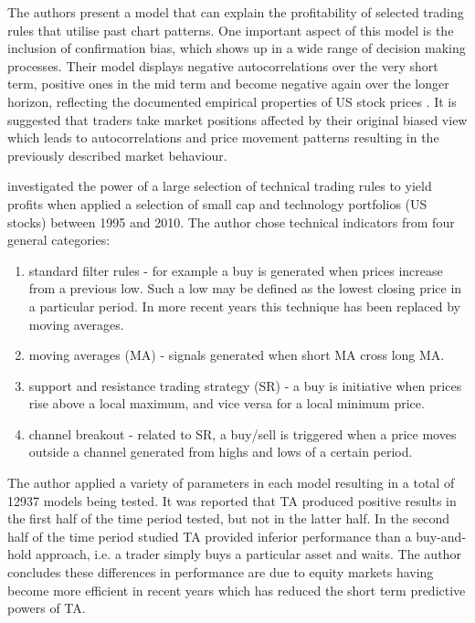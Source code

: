 The authors present a model that can explain the profitability of selected trading rules that utilise past chart patterns. One important aspect of this model is the inclusion of confirmation bias, which shows up in a wide range of decision making processes. Their model displays negative autocorrelations over the very short term, positive ones in the
mid term and become negative again over the longer horizon, reflecting the documented empirical properties of US stock prices \citep{NovyMarx2012429, Moskowitz2012228, Fama2012457}.  It is suggested that traders take market positions affected by their original biased view which leads to autocorrelations and price movement patterns resulting in the previously described market behaviour.

\cite{Shynkevich2012193} investigated the power of a large selection of technical trading rules to yield profits when applied a selection of small cap and technology portfolios (US stocks) between 1995 and 2010. The author chose technical indicators from four general categories:
\begin{enumerate}
\item standard filter rules - for example a buy is generated when prices increase from a previous low. Such a low may be defined as the lowest closing price in a particular period. In more recent years this technique has been replaced by moving averages. 
\item  moving averages (MA) - signals generated when short MA cross long MA. 
\item  support and resistance trading strategy (SR) - a buy is initiative when prices rise above a local maximum, and vice versa for a local minimum price.
\item  channel breakout - related to SR, a buy/sell is triggered when a price moves outside a channel generated from highs and lows of a certain period.
\end{enumerate}
The author applied a variety of parameters in each model resulting in a total of 12937 models being tested. It was reported that TA produced positive results in the first half of the time period tested, but not in the latter half. In the second half of the time period studied TA provided inferior performance than a buy-and-hold approach, i.e. a trader simply buys a particular asset and waits. The author concludes these differences in performance are due to equity markets having become more efficient in recent years which has reduced the short term predictive powers of TA.

